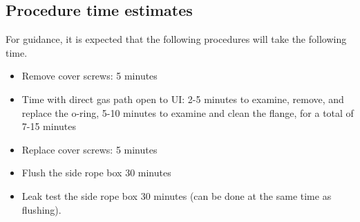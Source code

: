 \documentclass[11pt]{article}
\begin{document}
\subsection{Procedure time estimates}
For guidance, it is expected that the following procedures will take the following time. 
\begin{itemize}
\item Remove cover screws: 5 minutes
\item Time with direct gas path open to UI: 2-5 minutes to examine, remove, and replace the o-ring, 5-10 minutes to examine and clean the flange, for a total of 7-15 minutes
\item Replace cover screws: 5 minutes
\item Flush the side rope box 30 minutes
\item Leak test the side rope box 30 minutes (can be done at the same time as flushing).
\end{itemize}
\end{document}
